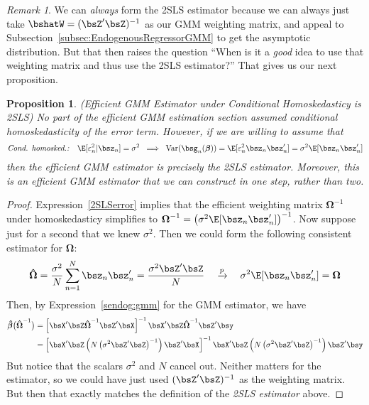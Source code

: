 \documentclass[12pt]{article}
\theoremstyle{plain}
\newtheorem{prop}[thm]{Proposition}
\theoremstyle{definition}
\theoremstyle{remark}
\newtheorem*{rmk}{Remark}
\newcommand{\bsbeta}{\boldsymbol{\beta}}
\newcommand{\bsOmega}{\boldsymbol{\Omega}}
\newcommand{\bshatbeta}{\boldsymbol{\hat{\beta}}}
\newcommand{\bshatOmega}{\boldsymbol{\hat{\Omega}}}
\newcommand{\Var}{\operatorname{Var}}
\newcommand{\pto}{\xrightarrow{p}}
\newcommand{\sumnN}{\sum^N_{n=1}}
\begin{document}
\begin{rmk}
We can \emph{always} form the 2SLS estimator because we can always just
take $\bshatW=(\bsZ'\bsZ)^{-1}$ as our GMM weighting matrix, and appeal
to Subsection~\ref{subsec:EndogenousRegressorGMM} to get the asymptotic
distribution.  But that then raises the question ``When is it a
\emph{good} idea to use that weighting matrix and thus use the 2SLS
estimator?'' That gives us our next proposition.
\end{rmk}


\begin{prop}
\emph{%
  (Efficient GMM Estimator under Conditional Homoskedasticy is 2SLS)}
No part of the efficient GMM estimation section assumed conditional
homoskedasticity of the error term. However, if we are willing to assume
that
\begin{align}
  \text{\emph{Cond. homosked.:}}\quad
  \E[\varepsilon_n^2|\bsz_n] = \sigma^2
  \;\implies\;
  \Var(\bsg_n(\bsbeta))=
  \E[\varepsilon_n^2\bsz_n\bsz_n']
  = \sigma^2 \E[\bsz_n\bsz_n']
  \label{2SLSerror}
\end{align}
then the efficient GMM estimator is precisely the 2SLS estimator.
Moreover, this is an efficient GMM estimator that we can construct in
one step, rather than two.
\end{prop}

\begin{proof}
Expression~\ref{2SLSerror} implies that the efficient weighting matrix
$\bsOmega^{-1}$ under homoskedasticy simplifies to
$\bsOmega^{-1}=\left(\sigma^2 \E[\bsz_n\bsz_n']\right)^{-1}$.
Now suppose just for a second that we knew $\sigma^2$. Then we could
form the following consistent estimator for $\bsOmega$:
\begin{align*}
  \bshatOmega
  = \frac{\sigma^2}{N} \sumnN \bsz_n\bsz_n'
  = \frac{\sigma^2\bsZ'\bsZ}{N}
  \quad\pto\quad
  \sigma^2 \E[\bsz_n\bsz_n']
  = \bsOmega
\end{align*}
Then, by Expression~\ref{sendog:gmm} for the GMM estimator, we have
\begin{align*}
  \bshatbeta\big(
  \bshatOmega^{-1}
  \big)
  &=
  \left[
  \bsX'\bsZ
  \bshatOmega^{-1}
  \bsZ'\bsX
  \right]^{-1}
  \bsX'\bsZ
  \bshatOmega^{-1}
  \bsZ'\bsy
  \\
  &=
  \left[
  \bsX'\bsZ
    \left(N\left(\sigma^2 \bsZ'\bsZ\right)^{-1}\right)
  \bsZ'\bsX
  \right]^{-1}
  \bsX'\bsZ\left(N\left(\sigma^2 \bsZ'\bsZ\right)^{-1}\right)\bsZ'\bsy
\end{align*}
But notice that the scalars $\sigma^2$ and $N$ cancel out. Neither
matters for the estimator, so we could have just used $(\bsZ'\bsZ)^{-1}$
as the weighting matrix. But then that exactly matches the definition of
the \emph{2SLS estimator} above.
\end{proof}
\end{document}
